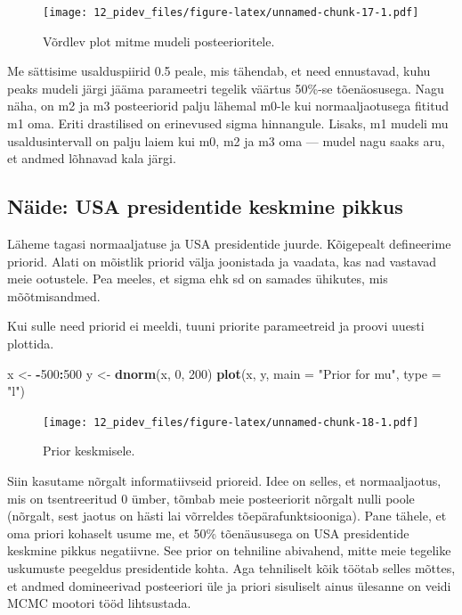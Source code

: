 \documentclass[]{book}
\newenvironment{Shaded}{\begin{snugshade}}{\end{snugshade}}
\newcommand{\KeywordTok}[1]{\textcolor[rgb]{0.13,0.29,0.53}{\textbf{#1}}}
\newcommand{\DataTypeTok}[1]{\textcolor[rgb]{0.13,0.29,0.53}{#1}}
\newcommand{\DecValTok}[1]{\textcolor[rgb]{0.00,0.00,0.81}{#1}}
\newcommand{\StringTok}[1]{\textcolor[rgb]{0.31,0.60,0.02}{#1}}
\newcommand{\OperatorTok}[1]{\textcolor[rgb]{0.81,0.36,0.00}{\textbf{#1}}}
\newcommand{\NormalTok}[1]{#1}
\begin{document}
\begin{figure}
\centering
\texttt{[image: 12\_pidev\_files/figure-latex/unnamed-chunk-17-1.pdf]}
\caption{\label{fig:unnamed-chunk-17}Võrdlev plot mitme mudeli
posteerioritele.}
\end{figure}

Me sättisime usalduspiirid 0.5 peale, mis tähendab, et need ennustavad,
kuhu peaks mudeli järgi jääma parameetri tegelik väärtus 50\%-se
tõenäosusega. Nagu näha, on m2 ja m3 posteeriorid palju lähemal m0-le
kui normaaljaotusega fititud m1 oma. Eriti drastilised on erinevused
sigma hinnangule. Lisaks, m1 mudeli mu usaldusintervall on palju laiem
kui m0, m2 ja m3 oma --- mudel nagu saaks aru, et andmed lõhnavad kala
järgi.

\subsection*{Näide: USA presidentide keskmine
pikkus}\label{naide-usa-presidentide-keskmine-pikkus}

Läheme tagasi normaaljatuse ja USA presidentide juurde. Kõigepealt
defineerime priorid. Alati on mõistlik priorid välja joonistada ja
vaadata, kas nad vastavad meie ootustele. Pea meeles, et sigma ehk sd on
samades ühikutes, mis mõõtmisandmed.

Kui sulle need priorid ei meeldi, tuuni priorite parameetreid ja proovi
uuesti plottida.

\begin{Shaded}
\begin{Highlighting}[]
\NormalTok{x <-}\StringTok{ }\OperatorTok{-}\DecValTok{500}\OperatorTok{:}\DecValTok{500}
\NormalTok{y <-}\StringTok{ }\KeywordTok{dnorm}\NormalTok{(x, }\DecValTok{0}\NormalTok{, }\DecValTok{200}\NormalTok{)}
\KeywordTok{plot}\NormalTok{(x, y, }\DataTypeTok{main =} \StringTok{"Prior for mu"}\NormalTok{, }\DataTypeTok{type =} \StringTok{"l"}\NormalTok{)}
\end{Highlighting}
\end{Shaded}

\begin{figure}
\centering
\texttt{[image: 12\_pidev\_files/figure-latex/unnamed-chunk-18-1.pdf]}
\caption{\label{fig:unnamed-chunk-18}Prior keskmisele.}
\end{figure}

Siin kasutame nõrgalt informatiivseid prioreid. Idee on selles, et
normaaljaotus, mis on tsentreeritud 0 ümber, tõmbab meie posteeriorit
nõrgalt nulli poole (nõrgalt, sest jaotus on hästi lai võrreldes
tõepärafunktsiooniga). Pane tähele, et oma priori kohaselt usume me, et
50\% tõenäususega on USA presidentide keskmine pikkus negatiivne. See
prior on tehniline abivahend, mitte meie tegelike uskumuste peegeldus
presidentide kohta. Aga tehniliselt kõik töötab selles mõttes, et andmed
domineerivad posteeriori üle ja priori sisuliselt ainus ülesanne on
veidi MCMC mootori tööd lihtsustada.
\end{document}
